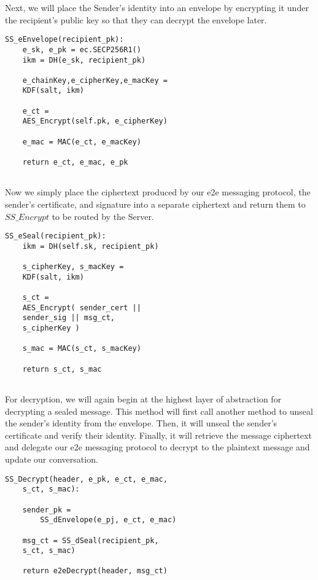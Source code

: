 \documentclass[conference]{IEEEtran}
\begin{document}
Next, we will place the Sender's identity into an envelope by encrypting it under the recipient's public key so that they can decrypt the envelope later. 
\newline
\begin{Verbatim}[frame=single]
SS_eEnvelope(recipient_pk):
    e_sk, e_pk = ec.SECP256R1()
    ikm = DH(e_sk, recipient_pk)
    
    e_chainKey,e_cipherKey,e_macKey =
    KDF(salt, ikm)

    e_ct =
    AES_Encrypt(self.pk, e_cipherKey)

    e_mac = MAC(e_ct, e_macKey)

    return e_ct, e_mac, e_pk
        
\end{Verbatim}

Now we simply place the ciphertext produced by our e2e messaging protocol, the sender's certificate, and signature into a separate ciphertext and return them to $SS\_Encrypt$ to be routed by the Server.
\newline

\begin{Verbatim}[frame=single]
SS_eSeal(recipient_pk):
    ikm = DH(self.sk, recipient_pk)
    
    s_cipherKey, s_macKey =
    KDF(salt, ikm)

    s_ct =
    AES_Encrypt( sender_cert || 
    sender_sig || msg_ct,
    s_cipherKey )

    s_mac = MAC(s_ct, s_macKey)

    return s_ct, s_mac
        
\end{Verbatim}

For decryption, we will again begin at the highest layer of abstraction for decrypting a sealed message. This method will first call another method to unseal the sender's identity from the envelope. Then, it will unseal the sender's certificate and verify their identity. Finally, it will retrieve the message ciphertext and delegate our e2e messaging protocol to decrypt to the plaintext message and update our conversation.
\newline
\begin{Verbatim}[frame=single]
SS_Decrypt(header, e_pk, e_ct, e_mac, 
    s_ct, s_mac):
    
    sender_pk = 
        SS_dEnvelope(e_pj, e_ct, e_mac)

    msg_ct = SS_dSeal(recipient_pk, 
    s_ct, s_mac)

    return e2eDecrypt(header, msg_ct)

\end{Verbatim}
\end{document}
